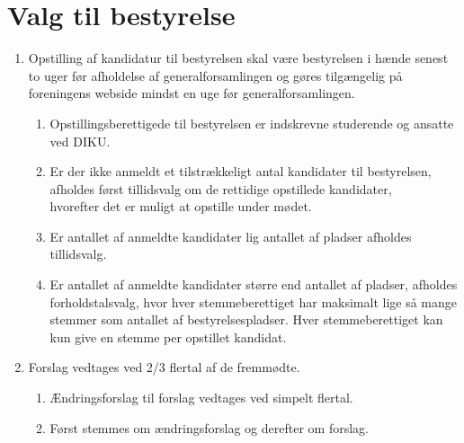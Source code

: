\documentclass[a4paper]{article}
\newenvironment{stykenum}{
  \begin{enumerate}[%
    label=Stk.~\arabic*., ref=\theenumi~Stk.~\arabic*, start=2]
}{\end{enumerate}}
\begin{document}
\section*{Valg til bestyrelse}

\begin{enumerate}[resume*=afsnit]

\item Opstilling af kandidatur til bestyrelsen skal være bestyrelsen i hænde
senest to uger før afholdelse af generalforsamlingen og gøres tilgængelig på
foreningens webside mindst en uge før generalforsamlingen.

  \begin{stykenum}

  \item Opstillingsberettigede til bestyrelsen er indskrevne studerende og
        ansatte ved DIKU.

  \item Er der ikke anmeldt et tilstrækkeligt antal kandidater til bestyrelsen,
        afholdes først tillidsvalg om de rettidige opstillede kandidater,\\
        hvorefter det er muligt at opstille under mødet.

  \item Er antallet af anmeldte kandidater lig antallet af pladser afholdes
        tillidsvalg.

  \item Er antallet af anmeldte kandidater større end antallet af pladser,
        afholdes forholdstalsvalg, hvor hver stemmeberettiget har maksimalt lige
        så mange stemmer som antallet af bestyrelsespladser. Hver
        stemmeberettiget kan kun give en stemme per opstillet kandidat.

  \end{stykenum}

\item Forslag vedtages ved 2/3 flertal af de fremmødte.

  \begin{stykenum}

  \item Ændringsforslag til forslag vedtages ved simpelt flertal.

  \item Først stemmes om ændringsforslag og derefter om forslag.

  \end{stykenum}

\end{enumerate}
\end{document}
